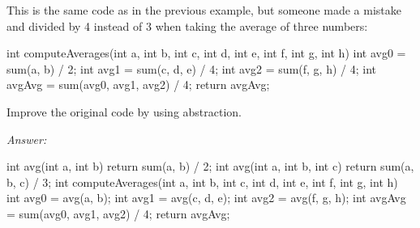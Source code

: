 \begin{example}
This is the same code as in the previous example, but
someone made a mistake and divided by 4 instead of 3
when taking the average of three numbers:
\begin{code}
int computeAverages(int a, int b, int c, int d, int e, int f, int g, int h) {
  int avg0 = sum(a, b) / 2;
  int avg1 = sum(c, d, e) / 4;
  int avg2 = sum(f, g, h) / 4;
  int avgAvg = sum(avg0, avg1, avg2) / 4;
  return avgAvg;
}
\end{code}
Improve the original code by using abstraction.

\noindent \emph{Answer:}
\begin{code}
int avg(int a, int b) {
  return sum(a, b) / 2;
}
int avg(int a, int b, int c) {
  return sum(a, b, c) / 3;
}
int computeAverages(int a, int b, int c, int d, int e, int f, int g, int h) {
  int avg0 = avg(a, b);
  int avg1 = avg(c, d, e);
  int avg2 = avg(f, g, h);
  int avgAvg = sum(avg0, avg1, avg2) / 4;
  return avgAvg;
}
\end{code}

\end{example}
